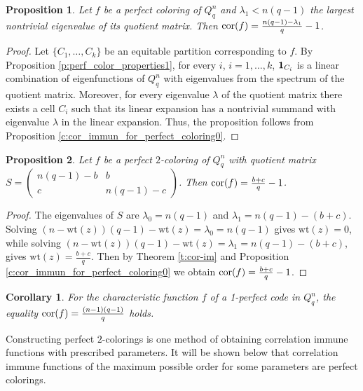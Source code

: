 \documentclass[11pt]{article}
\newtheorem{claim}{Proposition}[section]
\newtheorem{corollary}{Corollary}[section]
\theoremstyle{definition}
\newcommand{\cor}{{\rm cor}}
\begin{document}
{{{\begin{claim}\label{c:cor_immun_for_perfect_coloring01}
Let $f$ be a perfect coloring of  $Q^n_q$ and
$\lambda_1<n(q-1)$ the largest nontrivial eigenvalue
of its quotient matrix. Then $\cor(f)=
\frac{n(q-1)-\lambda_1}{q}-1$.
\end{claim}
\begin{proof}
Let $\{C_1, \dots, C_k\}$ be an equitable partition corresponding to $f$.  By Proposition \ref{p:perf_color_properties1}, for every $i$, $i=1,\dots,k$, 
${\bf 1}_{C_i} $ is a linear combination of eigenfunctions of $Q^n_q$ with eigenvalues from the spectrum of the quotient matrix.  Moreover, for every eigenvalue $\lambda$ of the quotient matrix there exists a cell $C_i$ such that  its linear expansion  has a nontrivial summand with eigenvalue $\lambda$ in the linear expansion. Thus, the proposition follows from Proposition \ref{c:cor_immun_for_perfect_coloring0}.
\end{proof}


\begin{claim}\label{c:cor_immun_for_perfect_coloring}
    Let $f$ be a perfect $2$-coloring of $Q^n_q$ with quotient matrix $S=\begin{pmatrix}
    n(q-1)-b & b\\
    c & n(q-1)-c
    \end{pmatrix}$. Then $\cor(f)=\frac{b+c}{q}-1$.
\end{claim}
\begin{proof}
The eigenvalues of $S$ are
$\lambda_0=n(q-1)$ and $\lambda_1=n(q-1)-(b+c)$.  Solving  $(n-\mathrm{wt}(z))(q-1)-\mathrm{wt}(z)=\lambda_0=n(q-1)$ gives 
$\mathrm{wt}(z)=0$, while solving
$(n-\mathrm{wt}(z))(q-1)-\mathrm{wt}(z)=\lambda_1=n(q-1)-(b+c)$,
gives $\mathrm{wt}(z)=\frac{b+c}{q}$. Then by Theorem
\ref{t:cor-im} and Proposition \ref{c:cor_immun_for_perfect_coloring0}
we obtain $\cor(f)=\frac{b+c}{q}-1$.
\end{proof}

\begin{corollary}
For the characteristic function $f$ of a 1-perfect code in 
$Q_q^n$, the equality $\cor(f)= \frac{(n-1)(q-1)}{q}$ holds.
\end{corollary}

Constructing perfect $2$-colorings is one method of obtaining correlation immune functions with prescribed parameters.
 It will be shown below that correlation immune functions
of the maximum possible order for some parameters are perfect
colorings.

}}}
\end{document}

